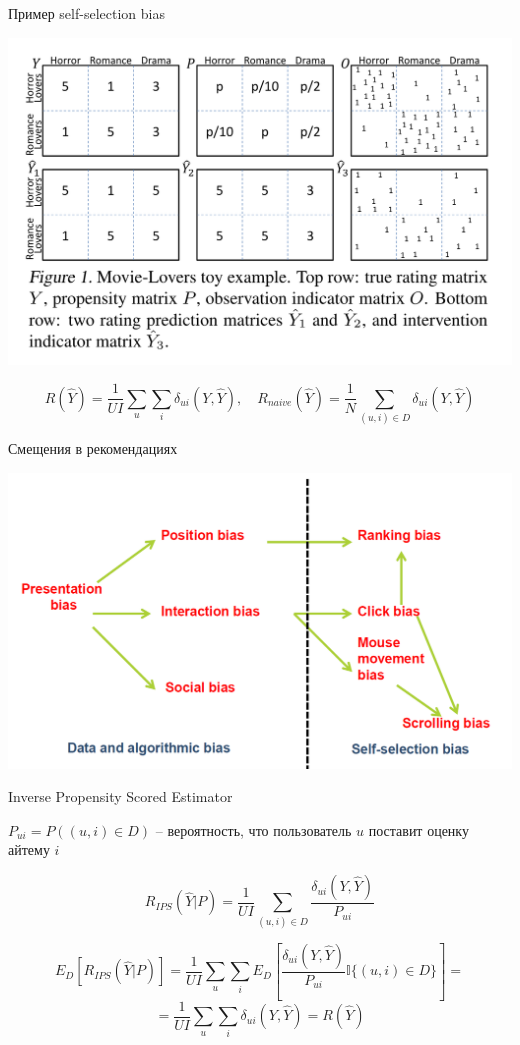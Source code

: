 \documentclass[11pt,aspectratio=169]{beamer}
\begin{document}
\begin{frame}{Пример self-selection bias}

\begin{center}
\includegraphics[scale=0.3]{images/bias-example.png}
\end{center}

\[
R(\hat Y) = \frac{1}{U I} \sum_u \sum_i \delta_{ui} (Y, \hat Y), \quad R_{naive}(\hat Y) = \frac{1}{N} \sum_{(u,i) \in D} \delta_{ui}(Y, \hat Y)
\]

\end{frame}

\begin{frame}{Смещения в рекомендациях \cite{BIAS}}

\begin{center}
\includegraphics[scale=0.2]{images/bias.png}
\end{center}

\end{frame}

\begin{frame}{Inverse Propensity Scored Estimator \cite{TREATMENTS}}

$P_{ui} = P((u, i) \in D)$ -- вероятность, что пользователь $u$ поставит оценку айтему $i$

\[
R_{IPS}(\hat Y | P) = \frac{1}{U I} \sum_{(u,i) \in D} \frac{\delta_{ui}(Y, \hat Y)}{P_{ui}}
\]

\[
E_D [R_{IPS}(\hat Y | P)] = \frac{1}{U I} \sum_u \sum_i E_D\left[ \frac{\delta_{ui}(Y, \hat Y)}{P_{ui}} \mathbb{I}\{(u, i) \in D\}\right] = 
\]
\[
= \frac{1}{U I} \sum_u \sum_i \delta_{ui} (Y, \hat Y) = R(\hat Y) 
\]

\end{frame}
\end{document}
